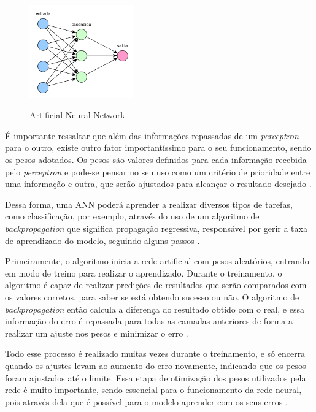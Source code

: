 \begin{figure}[!htb]
	\centering
	\caption{Artificial Neural Network}
	\includegraphics[width=0.40\textwidth]{img/neuralNetwork.png}
	\label{fig:neuralNetwork}
\end{figure}

É importante ressaltar que além das informações repassadas de um \emph{perceptron} para o outro, existe outro fator importantíssimo para o seu funcionamento, sendo os pesos adotados. Os pesos são valores definidos para cada informação recebida pelo \emph{perceptron} e pode-se pensar no seu uso como um critério de prioridade entre uma informação e outra, que serão ajustados para alcançar o resultado desejado \cite{deepLearningTensorFlow}.

Dessa forma, uma ANN poderá aprender a realizar diversos tipos de tarefas, como classificação, por exemplo, através do uso de um algoritmo de \emph{backpropagation} que significa propagação regressiva, responsável por gerir a taxa de aprendizado do modelo, seguindo alguns passos \cite{deepLearningTensorFlow}.

Primeiramente, o algoritmo inicia a rede artificial com pesos aleatórios, entrando em modo de treino para realizar o aprendizado. Durante o treinamento, o algoritmo é capaz de realizar predições de resultados que serão comparados com os valores corretos, para saber se está obtendo sucesso ou não. O algoritmo de \emph{backpropagation} então calcula a diferença do resultado obtido com o real, e essa informação do erro é repassada para todas as camadas anteriores de forma a realizar um ajuste nos pesos e minimizar o erro \cite{deepLearningTensorFlow}.

Todo esse processo é realizado muitas vezes durante o treinamento, e só encerra quando os ajustes levam ao aumento do erro novamente, indicando que os pesos foram ajustados até o limite. Essa etapa de otimização dos pesos utilizados pela rede é muito importante, sendo essencial para o funcionamento da rede neural, pois através dela que é possível para o modelo aprender com os seus erros \cite{deepLearningTensorFlow}.

